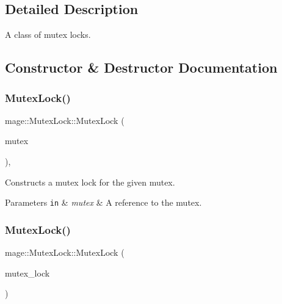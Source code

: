 \subsection{Detailed Description}
A class of mutex locks. 

\subsection{Constructor \& Destructor Documentation}
\hypertarget{classmage_1_1_mutex_lock_a6759bb3a22b81aa5f3e82f7b7757024f}{}\label{classmage_1_1_mutex_lock_a6759bb3a22b81aa5f3e82f7b7757024f} 
\subsubsection{\texorpdfstring{Mutex\+Lock()}{MutexLock()}\hspace{0.1cm}{\footnotesize\ttfamily [1/3]}}
{\footnotesize\ttfamily mage\+::\+Mutex\+Lock\+::\+Mutex\+Lock (\begin{DoxyParamCaption}\item[{\hyperlink{classmage_1_1_mutex}{Mutex} \&}]{mutex }\end{DoxyParamCaption})\hspace{0.3cm}{\ttfamily [explicit]}, {\ttfamily [noexcept]}}

Constructs a mutex lock for the given mutex.


\begin{DoxyParams}[1]{Parameters}
\mbox{\tt in}  & {\em mutex} & A reference to the mutex. \\
\hline
\end{DoxyParams}
\hypertarget{classmage_1_1_mutex_lock_a20b0f44c31bcb2040cbf23f071870af9}{}\label{classmage_1_1_mutex_lock_a20b0f44c31bcb2040cbf23f071870af9} 
\subsubsection{\texorpdfstring{Mutex\+Lock()}{MutexLock()}\hspace{0.1cm}{\footnotesize\ttfamily [2/3]}}
{\footnotesize\ttfamily mage\+::\+Mutex\+Lock\+::\+Mutex\+Lock (\begin{DoxyParamCaption}\item[{const \hyperlink{classmage_1_1_mutex_lock}{Mutex\+Lock} \&}]{mutex\+\_\+lock }\end{DoxyParamCaption})\hspace{0.3cm}{\ttfamily [delete]}}

